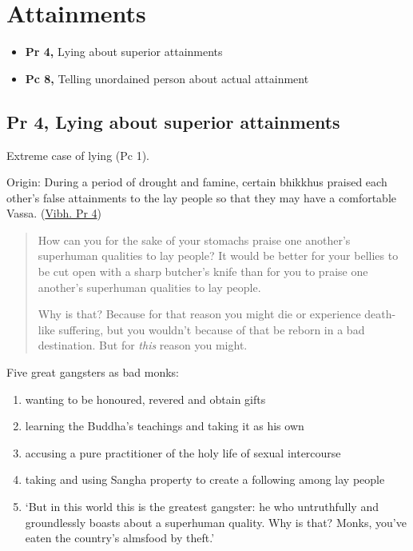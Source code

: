 \chapter{Attainments}

\begin{itemize}
\tightlist
\item
  \textbf{Pr 4,} Lying about superior attainments
\item
  \textbf{Pc 8,} Telling unordained person about actual attainment
\end{itemize}


\section{Pr 4, Lying about superior attainments}

Extreme case of lying (Pc 1).

Origin: During a period of drought and famine, certain bhikkhus praised
each other's false attainments to the lay people so that they may have a
comfortable Vassa.
(\href{https://suttacentral.net/pli-tv-bu-vb-pj4/en/brahmali}{Vibh. Pr
4})

\begin{quote}
How can you for the sake of your stomachs praise one another's
superhuman qualities to lay people? It would be better for your bellies
to be cut open with a sharp butcher's knife than for you to praise one
another's superhuman qualities to lay people.

Why is that? Because for that reason you might die or experience
death-like suffering, but you wouldn't because of that be reborn in a
bad destination. But for \emph{this} reason you might.
\end{quote}

\clearpage

Five great gangsters as bad monks:

\begin{enumerate}
\def\labelenumi{\arabic{enumi}.}
\tightlist
\item
  wanting to be honoured, revered and obtain gifts
\item
  learning the Buddha's teachings and taking it as his own
\item
  accusing a pure practitioner of the holy life of sexual intercourse
\item
  taking and using Sangha property to create a following among lay
  people
\item
  `But in this world this is the greatest gangster: he who untruthfully
  and groundlessly boasts about a superhuman quality. Why is that?
  Monks, you've eaten the country's almsfood by theft.'
\end{enumerate}


